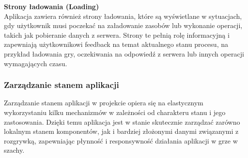 \documentclass[12pt,a4paper]{article}
\begin{document}
\textbf{Strony ładowania (Loading)}\\
Aplikacja zawiera również strony ładowania, które są wyświetlane w sytuacjach, gdy użytkownik musi poczekać na załadowanie zasobów lub wykonanie operacji, takich jak pobieranie danych z serwera. Strony te pełnią rolę informacyjną i zapewniają użytkownikowi feedback na temat aktualnego stanu procesu, na przykład ładowania gry, oczekiwania na odpowiedź z serwera lub innych operacji wymagających czasu.


\newpage
\subsubsection{Zarządzanie stanem aplikacji}
Zarządzanie stanem aplikacji w projekcie opiera się na elastycznym wykorzystaniu kilku mechanizmów w zależności od charakteru stanu i jego zastosowania. Dzięki temu aplikacja jest w stanie skutecznie zarządzać zarówno lokalnym stanem komponentów, jak i bardziej złożonymi danymi związanymi z rozgrywką, zapewniając płynność i responsywność działania aplikacji w grze w szachy.
\end{document}
